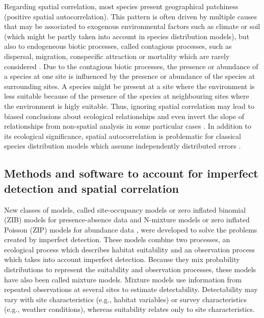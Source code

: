 \documentclass[a4paper, 12pt, leqno]{article}\usepackage[]{graphicx}\usepackage[]{color}
\begin{document}
Regarding spatial correlation, most species present geographical patchiness (positive
spatial autocorrelation). This pattern is often driven by multiple causes that may be
associated to exogenous environmental factors such as climate or soil (which might be
partly taken into account in species distribution models), but also to endogeneous biotic
processes, called contagious processes, such as dispersal, migration, conspecific
attraction or mortality which are rarely considered
\citep{Sokal1978b,Legendre1993b,Lichstein2002,Dormann2007}. Due to the contagious biotic
processes, the presence or abundance of a species at one site is influenced by the
presence or abundance of the species at surrounding sites. A species might be present at a
site where the environment is less suitable because of the presence of the species at
neighbouring sites where the environment is higly suitable. Thus, ignoring spatial
correlation may lead to biased conclusions about ecological relationships
\citep{Lichstein2002} and even invert the slope of relationships from non-spatial analysis
in some particular cases \citep{Kuhn2006}. In addition to its ecological significance,
spatial autocorrelation is problematic for classical species distribution models which
assume independently distributed errors \citep{Legendre1993b,Lichstein2002,Dormann2007}.

\subsection{Methods and software to account for imperfect detection and spatial correlation}

New classes of models, called site-occupancy models \citep{MacKenzie2002} or zero inflated
binomial (ZIB) models \citep{Latimer2006} for presence-absence data and N-mixture models
\citep{Royle2004} or zero inflated Poisson (ZIP) models for abundance data
\citep{Flores2009}, were developed to solve the problems created by imperfect
detection. These models combine two processes, an ecological process which describes
habitat suitability and an observation process which takes into account imperfect
detection. Because they mix probability distributions to represent the suitability and
observation processes, these models have also been called mixture models. Mixture models
use information from repeated observations at several sites to estimate
detectability. Detectability may vary with site characteristics (e.g., habitat variables)
or survey characteristics (e.g., weather conditions), whereas suitability relates only to
site characteristics.
\end{document}
